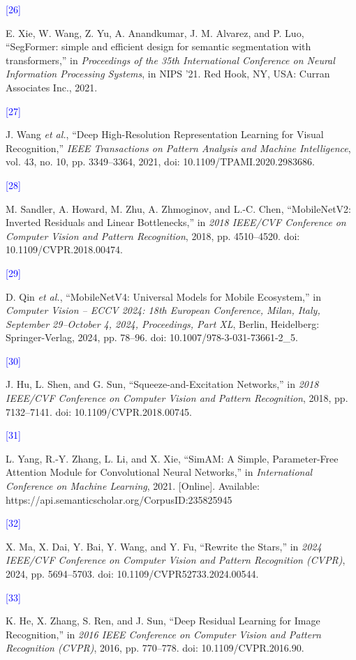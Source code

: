 \documentclass[
]{article}
\begin{document}
\hypertarget{ref:26}{\textcolor{blue}{[26]}} E. Xie, W. Wang, Z. Yu,
A. Anandkumar, J. M. Alvarez, and P. Luo, ``SegFormer: simple and
efficient design for semantic segmentation with transformers,'' in
\emph{Proceedings of the 35th International Conference on Neural
Information Processing Systems}, in NIPS '21. Red Hook, NY, USA: Curran
Associates Inc., 2021.

\hypertarget{ref:27}{\textcolor{blue}{[27]}} J. Wang \emph{et al.}, ``Deep
High-Resolution Representation Learning for Visual Recognition,''
\emph{IEEE Transactions on Pattern Analysis and Machine Intelligence},
vol. 43, no. 10, pp. 3349--3364, 2021, doi:
10.1109/TPAMI.2020.2983686.

\hypertarget{ref:28}{\textcolor{blue}{[28]}} M. Sandler, A. Howard, M. Zhu, A.
Zhmoginov, and L.-C. Chen, ``MobileNetV2: Inverted Residuals and Linear
Bottlenecks,'' in \emph{2018 IEEE/CVF Conference on Computer Vision and
Pattern Recognition}, 2018, pp. 4510--4520. doi:
10.1109/CVPR.2018.00474.

\hypertarget{ref:29}{\textcolor{blue}{[29]}} D. Qin \emph{et al.}, ``MobileNetV4:
Universal Models for Mobile Ecosystem,'' in \emph{Computer Vision --
ECCV 2024: 18th European Conference, Milan, Italy, September 29--October
4, 2024, Proceedings, Part XL}, Berlin, Heidelberg: Springer-Verlag,
2024, pp. 78--96. doi: 10.1007/978-3-031-73661-2\_5.

\hypertarget{ref:30}{\textcolor{blue}{[30]}} J. Hu, L.
Shen, and G. Sun, ``Squeeze-and-Excitation Networks,'' in \emph{2018
IEEE/CVF Conference on Computer Vision and Pattern Recognition}, 2018,
pp. 7132--7141. doi: 10.1109/CVPR.2018.00745.

\hypertarget{ref:31}{\textcolor{blue}{[31]}} L. Yang, R.-Y.
Zhang, L. Li, and X. Xie, ``SimAM: A Simple, Parameter-Free Attention
Module for Convolutional Neural Networks,'' in \emph{International
Conference on Machine Learning}, 2021. {[}Online{]}. Available:
https://api.semanticscholar.org/CorpusID:235825945

\hypertarget{ref:32}{\textcolor{blue}{[32]}} X. Ma, X. Dai, Y. Bai, Y. Wang,
and Y. Fu, ``Rewrite the Stars,'' in \emph{2024 IEEE/CVF Conference on
Computer Vision and Pattern Recognition (CVPR)}, 2024, pp. 5694--5703.
doi: 10.1109/CVPR52733.2024.00544.

\hypertarget{ref:33}{\textcolor{blue}{[33]}} K. He, X. Zhang, S. Ren, and
J. Sun, ``Deep Residual Learning for Image Recognition,'' in \emph{2016
IEEE Conference on Computer Vision and Pattern Recognition (CVPR)},
2016, pp. 770--778. doi: 10.1109/CVPR.2016.90.
\end{document}
